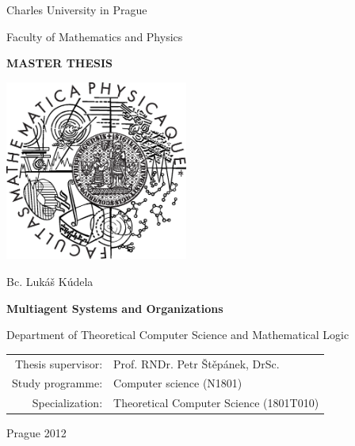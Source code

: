 
\begin{titlepage}
\begin{center}

\large
Charles University in Prague

\medskip

Faculty of Mathematics and Physics

\vfill

{\Large \textbf{MASTER THESIS}}

\vfill

\includegraphics[width=60mm]{images/mff_logo.eps}

\vfill
\vspace{5mm}

{\LARGE Bc. Lukáš Kúdela}

\vspace{15mm}

{\LARGE \textbf{Multiagent Systems and Organizations}}

\vfill

Department of Theoretical Computer Science and Mathematical Logic

\vfill

\begin{tabular}{rl}
Thesis supervisor: & Prof. RNDr. Petr Štěpánek, DrSc.\\
\noalign{\vspace{2mm}}
Study programme: & Computer science (N1801)\\
\noalign{\vspace{2mm}}
Specialization: & Theoretical Computer Science (1801T010)\\
\end{tabular}

\vfill

Prague 2012

\end{center}
\end{titlepage}